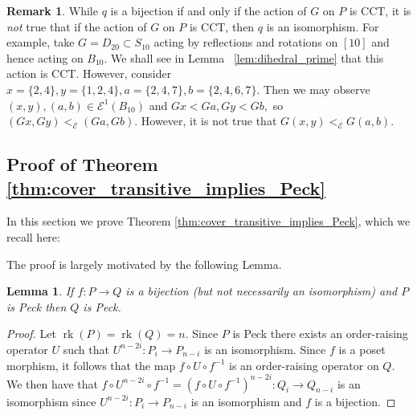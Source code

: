 \documentclass[10 pt]{amsart}
\theoremstyle{plain}
\newtheorem{lem}[thm]{Lemma}
\theoremstyle{definition}
\newtheorem{rem}[thm]{Remark}
\theoremstyle{remark}
\numberwithin{equation}{section}
\newcommand\ssec{\subsection}
\newcommand\rk{\operatorname{rk}}
\begin{document}
\begin{rem}
While $q$ is a bijection if and only if the action of $G$ on $P$ is CCT, it is {\it not} true that if the action of $G$ on $P$ is CCT, then $q$ is an isomorphism.  For example, take $G=D_{20} \subset S_{10}$ acting by reflections and rotations on $[10]$ and hence acting on $B_{10}.$ We shall see in Lemma ~\ref{lem:dihedral_prime} that this action is CCT. However, consider $x = \{2,4\},y = \{1,2,4\},a = \{2,4,7\},b = \{2,4,6,7\}.$ Then we may observe $(x , y),(a, b) \in \mathcal E^1(B_{10})$ and $Gx < Ga, Gy < Gb,$ so $(Gx, Gy) <_{\mathcal E} (Ga, Gb).$ However, it is not true that $G(x, y)<_{\mathcal E} G(a,b)$.
\end{rem}




\ssec{Proof of Theorem \ref{thm:cover_transitive_implies_Peck}}\label{ssec:proof_of_cover_transitive_implies_Peck}

In this section we prove Theorem \ref{thm:cover_transitive_implies_Peck}, which we recall here:

\cctpeck*

The proof is largely motivated by the following Lemma.

\begin{lem}\label{lem:bijection_peck_implication}
If $f:P\rightarrow Q$ is a bijection (but not necessarily an isomorphism) and $P$ is Peck then $Q$ is Peck.
\end{lem}
\begin{proof}
Let $\rk(P) = \rk(Q) = n$.  Since $P$ is Peck there exists an order-raising operator $U$ such that $U^{n-2i}\colon P_i\rightarrow P_{n-i}$ is an isomorphism.  Since $f$ is a poset morphism, it follows that the map $f\circ U\circ f^{-1}$ is an order-raising operator on $Q$.  We then have that $f\circ U^{n-2i}\circ f^{-1} = \left(f\circ U\circ f^{-1}\right)^{n-2i}\colon Q_i\rightarrow Q_{n-i}$ is an isomorphism since $U^{n-2i}\colon P_i\rightarrow P_{n-i}$ is an isomorphism and $f$ is a bijection.

\end{proof}
\end{document}
